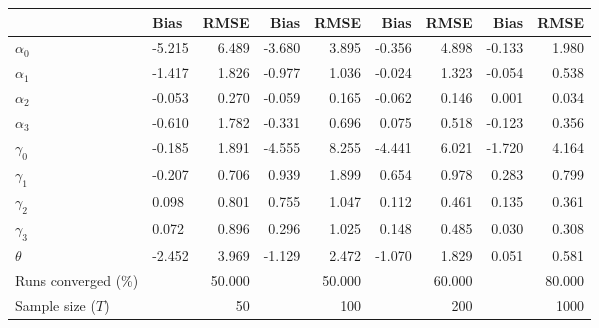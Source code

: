 
\begin{tabular}[t]{llrrrrrrr}
\toprule
  & Bias & RMSE & Bias & RMSE & Bias & RMSE & Bias & RMSE\\
\midrule
$\alpha_{0}$ & -5.215 & 6.489 & -3.680 & 3.895 & -0.356 & 4.898 & -0.133 & 1.980\\
$\alpha_{1}$ & -1.417 & 1.826 & -0.977 & 1.036 & -0.024 & 1.323 & -0.054 & 0.538\\
$\alpha_{2}$ & -0.053 & 0.270 & -0.059 & 0.165 & -0.062 & 0.146 & 0.001 & 0.034\\
$\alpha_{3}$ & -0.610 & 1.782 & -0.331 & 0.696 & 0.075 & 0.518 & -0.123 & 0.356\\
$\gamma_{0}$ & -0.185 & 1.891 & -4.555 & 8.255 & -4.441 & 6.021 & -1.720 & 4.164\\
$\gamma_{1}$ & -0.207 & 0.706 & 0.939 & 1.899 & 0.654 & 0.978 & 0.283 & 0.799\\
$\gamma_{2}$ & 0.098 & 0.801 & 0.755 & 1.047 & 0.112 & 0.461 & 0.135 & 0.361\\
$\gamma_{3}$ & 0.072 & 0.896 & 0.296 & 1.025 & 0.148 & 0.485 & 0.030 & 0.308\\
$\theta$ & -2.452 & 3.969 & -1.129 & 2.472 & -1.070 & 1.829 & 0.051 & 0.581\\
Runs converged (\%) &  & 50.000 &  & 50.000 &  & 60.000 &  & 80.000\\
Sample size ($T$) &  & 50 &  & 100 &  & 200 &  & 1000\\
\bottomrule
\end{tabular}
